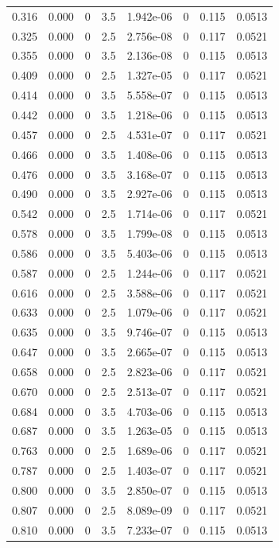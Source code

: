 \documentclass[preview]{standalone}
\begin{document}
{{\begin{tabular}{L{1.2cm}C{1.2cm} C{0.3cm}C{0.5cm} C{1.4cm}C{1.4cm} C{1.4cm}C{1.4cm}}
  0.316  &  0.000  & 0     & 3.5 &  1.942e-06  & 0  & 0.115 &  0.0513   \\ 
  0.325  &  0.000  & 0     & 2.5 &  2.756e-08  & 0  & 0.117 &  0.0521   \\ 
  0.355  &  0.000  & 0     & 3.5 &  2.136e-08  & 0  & 0.115 &  0.0513   \\ 
  0.409  &  0.000  & 0     & 2.5 &  1.327e-05  & 0  & 0.117 &  0.0521   \\ 
  0.414  &  0.000  & 0     & 3.5 &  5.558e-07  & 0  & 0.115 &  0.0513   \\ 
  0.442  &  0.000  & 0     & 3.5 &  1.218e-06  & 0  & 0.115 &  0.0513   \\ 
  0.457  &  0.000  & 0     & 2.5 &  4.531e-07  & 0  & 0.117 &  0.0521   \\ 
  0.466  &  0.000  & 0     & 3.5 &  1.408e-06  & 0  & 0.115 &  0.0513   \\ 
  0.476  &  0.000  & 0     & 3.5 &  3.168e-07  & 0  & 0.115 &  0.0513   \\ 
  0.490  &  0.000  & 0     & 3.5 &  2.927e-06  & 0  & 0.115 &  0.0513   \\ 
  0.542  &  0.000  & 0     & 2.5 &  1.714e-06  & 0  & 0.117 &  0.0521   \\ 
  0.578  &  0.000  & 0     & 3.5 &  1.799e-08  & 0  & 0.115 &  0.0513   \\ 
  0.586  &  0.000  & 0     & 3.5 &  5.403e-06  & 0  & 0.115 &  0.0513   \\ 
  0.587  &  0.000  & 0     & 2.5 &  1.244e-06  & 0  & 0.117 &  0.0521   \\ 
  0.616  &  0.000  & 0     & 2.5 &  3.588e-06  & 0  & 0.117 &  0.0521   \\ 
  0.633  &  0.000  & 0     & 2.5 &  1.079e-06  & 0  & 0.117 &  0.0521   \\ 
  0.635  &  0.000  & 0     & 3.5 &  9.746e-07  & 0  & 0.115 &  0.0513   \\ 
  0.647  &  0.000  & 0     & 3.5 &  2.665e-07  & 0  & 0.115 &  0.0513   \\ 
  0.658  &  0.000  & 0     & 2.5 &  2.823e-06  & 0  & 0.117 &  0.0521   \\ 
  0.670  &  0.000  & 0     & 2.5 &  2.513e-07  & 0  & 0.117 &  0.0521   \\ 
  0.684  &  0.000  & 0     & 3.5 &  4.703e-06  & 0  & 0.115 &  0.0513   \\ 
  0.687  &  0.000  & 0     & 3.5 &  1.263e-05  & 0  & 0.115 &  0.0513   \\ 
  0.763  &  0.000  & 0     & 2.5 &  1.689e-06  & 0  & 0.117 &  0.0521   \\ 
  0.787  &  0.000  & 0     & 2.5 &  1.403e-07  & 0  & 0.117 &  0.0521   \\ 
  0.800  &  0.000  & 0     & 3.5 &  2.850e-07  & 0  & 0.115 &  0.0513   \\ 
  0.807  &  0.000  & 0     & 2.5 &  8.089e-09  & 0  & 0.117 &  0.0521   \\ 
  0.810  &  0.000  & 0     & 3.5 &  7.233e-07  & 0  & 0.115 &  0.0513   \\ 
\hline 
\end{tabular} 

}}
\end{document}
